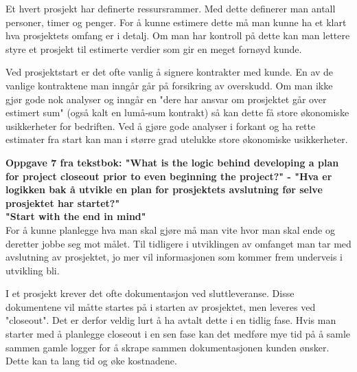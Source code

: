 		Et hvert prosjekt har definerte ressursrammer. Med dette definerer man antall 
		personer, timer og penger. For å kunne estimere dette må man kunne ha et klart
		hva prosjektets omfang er i detalj. Om man har kontroll på dette kan man lettere
		styre et prosjekt til estimerte verdier som gir en meget fornøyd kunde. 

		Ved prosjektstart er det ofte vanlig å signere kontrakter med kunde. En av de
		vanlige kontraktene man inngår går på forsikring av overskudd. Om man ikke gjør
		gode nok analyser og inngår en "dere har ansvar om prosjektet går over estimert
		sum" (også kalt en lumå-sum kontrakt) så kan dette få store økonomiske usikkerheter
		for bedriften. Ved å gjøre gode analyser i forkant og ha rette estimater fra start
		kan man i større grad utelukke store økonomiske usikkerheter. 

	\clearpage
	{\bf Oppgave 7 fra tekstbok: "What is the logic behind developing a plan for project closeout
	prior to even beginning the project?" - "Hva er logikken bak å utvikle en plan for prosjektets
	avslutning før selve prosjektet har startet?"} \\

		{\bf "Start with the end in mind" } \\
		For å kunne planlegge hva man skal gjøre må man vite hvor man skal ende og deretter
		jobbe seg mot målet. Til tidligere i utviklingen av omfanget man tar med avslutning 
		av prosjektet, jo mer vil informasjonen som kommer frem underveis i utvikling bli. 

		I et prosjekt krever det ofte dokumentasjon ved sluttleveranse. Disse dokumentene
		vil måtte startes på i starten av prosjektet, men leveres ved "closeout". Det 
		er derfor veldig lurt å ha avtalt dette i en tidlig fase. 
		Hvis man starter med å planlegge closeout i en sen fase kan det medføre mye 
		tid på å samle sammen gamle logger for å skrape sammen dokumentasjonen kunden
		ønsker. Dette kan ta lang tid og øke kostnadene.
